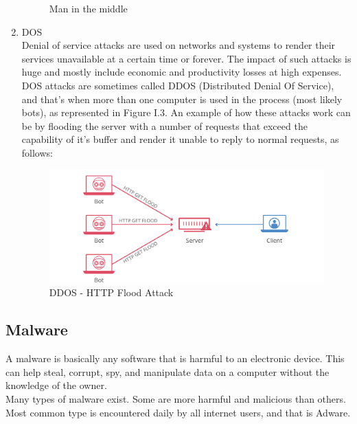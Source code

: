\begin{enumerate}
\begin{figure}[H]
    \caption{Man in the middle \cite{mitm}}
    \end{figure}
    \item DOS\\
    Denial of service attacks are used on networks and systems to render their services unavailable at a certain time or forever. The impact of such attacks is huge and mostly include economic and productivity losses at high expenses. DOS attacks are sometimes called DDOS (Distributed Denial Of Service), and that's when more than one computer is used in the process (most likely bots), as represented in Figure I.3. An example of how these attacks work can be by flooding the server with a number of requests that exceed the capability of it's buffer and render it unable to reply to normal requests, as follows:
    \begin{figure}[H]
    \centering
    \includegraphics[width=0.8\columnwidth]{Figures/flood_ddos.png}
    \caption{DDOS - HTTP Flood Attack \cite{ddos}}
    \end{figure}
    
    
\end{enumerate}
\subsection{Malware}
A malware is basically any software that is harmful to an electronic device. This can help steal, corrupt, spy, and manipulate data on a computer without the knowledge of the owner.\\
Many types of malware exist. Some are more harmful and malicious than others. Most common type is encountered daily by all internet users, and that is Adware.

